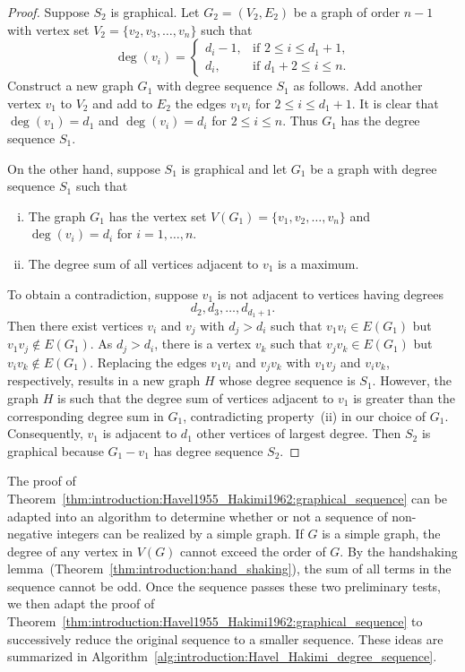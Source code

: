 \begin{proof}
Suppose $S_2$ is graphical. Let $G_2 = (V_2, E_2)$ be a graph of order
$n - 1$ with vertex set $V_2 = \{v_2, v_3, \dots, v_n\}$ such that
\[
\deg(v_i)
=
\begin{cases}
d_i - 1, & \text{if $2 \leq i \leq d_1 + 1$,} \\
d_i,     & \text{if $d_1 + 2 \leq i \leq n$.}
\end{cases}
\]
Construct a new graph $G_1$ with degree sequence $S_1$ as follows. Add
another vertex $v_1$ to $V_2$ and add to $E_2$ the edges $v_1 v_i$ for
$2 \leq i \leq d_1 + 1$. It is clear that $\deg(v_1) = d_1$ and
$\deg(v_i) = d_i$ for $2 \leq i \leq n$. Thus $G_1$ has the degree
sequence $S_1$.

On the other hand, suppose $S_1$ is graphical and let $G_1$ be a graph
with degree sequence $S_1$ such that
\begin{enumerate}[(i)]
\item The graph $G_1$ has the vertex set
  $V(G_1) = \{v_1, v_2, \dots, v_n\}$ and $\deg(v_i) = d_i$ for
  $i = 1, \dots, n$.

\item The degree sum of all vertices adjacent to $v_1$ is a maximum.
\end{enumerate}
To obtain a contradiction, suppose $v_1$ is not adjacent to vertices
having degrees
\[
d_2, d_3, \dots, d_{d_1 + 1}.
\]
Then there exist vertices $v_i$ and $v_j$ with $d_j > d_i$ such that
$v_1 v_i \in E(G_1)$ but $v_1 v_j \not\in E(G_1)$. As $d_j > d_i$,
there is a vertex $v_k$ such that $v_j v_k \in E(G_1)$ but
$v_i v_k \not\in E(G_1)$. Replacing the edges $v_1 v_i$ and $v_j v_k$
with $v_1 v_j$ and $v_i v_k$, respectively, results in a new graph $H$
whose degree sequence is $S_1$. However, the graph $H$ is such that
the degree sum of vertices adjacent to $v_1$ is greater than the
corresponding degree sum in $G_1$, contradicting property~(ii) in our
choice of $G_1$. Consequently, $v_1$ is adjacent to $d_1$ other
vertices of largest degree. Then $S_2$ is graphical because
$G_1 - v_1$ has degree sequence $S_2$.
\end{proof}

The proof of
Theorem~\ref{thm:introduction:Havel1955_Hakimi1962:graphical_sequence}
can be adapted into an algorithm to determine whether or not a
sequence of non-negative integers can be realized by a simple
graph. If $G$ is a simple graph, the degree of any vertex in $V(G)$
cannot exceed the order of $G$. By the handshaking
lemma~(Theorem~\ref{thm:introduction:hand_shaking}), the sum of all
terms in the sequence cannot be odd. Once the sequence passes these
two preliminary tests, we then adapt the proof of
Theorem~\ref{thm:introduction:Havel1955_Hakimi1962:graphical_sequence}
to successively reduce the original sequence to a smaller
sequence. These ideas are summarized in
Algorithm~\ref{alg:introduction:Havel_Hakimi_degree_sequence}.

